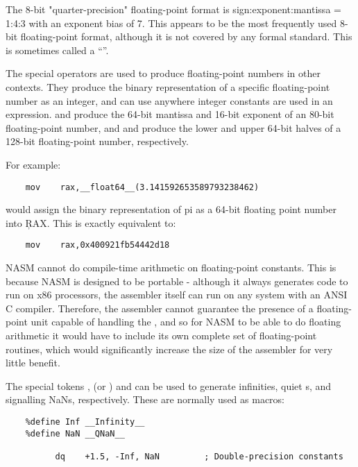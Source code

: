 The 8-bit "quarter-precision" floating-point format is
sign:exponent:mantissa = 1:4:3 with an exponent bias of 7. This
appears to be the most frequently used 8-bit floating-point format,
although it is not covered by any formal standard. This is sometimes
called a ``''.

The special operators are used to produce floating-point numbers in
other contexts. They produce the binary representation of a specific
floating-point number as an integer, and can use anywhere integer
constants are used in an expression.  and
 produce the 64-bit mantissa and 16-bit
exponent of an 80-bit floating-point number, and 
and  produce the lower and upper 64-bit halves
of a 128-bit floating-point number, respectively.

For example:

\begin{lstlisting}
	mov    rax,__float64__(3.141592653589793238462)
\end{lstlisting}

would assign the binary representation of pi as a 64-bit floating
point number into \c{RAX}. This is exactly equivalent to:

\begin{lstlisting}
	mov    rax,0x400921fb54442d18
\end{lstlisting}

NASM cannot do compile-time arithmetic on floating-point constants.
This is because NASM is designed to be portable - although it always
generates code to run on x86 processors, the assembler itself can
run on any system with an ANSI C compiler. Therefore, the assembler
cannot guarantee the presence of a floating-point unit capable of
handling the , and so for NASM
to be able to do floating arithmetic it would have to include its
own complete set of floating-point routines, which would significantly
increase the size of the assembler for very little benefit.

The special tokens ,  (or
) and  can be used to generate
infinities, quiet s, and signalling NaNs,
respectively. These are normally used as macros:

\begin{lstlisting}
	%define Inf __Infinity__
	%define NaN __QNaN__

	      dq    +1.5, -Inf, NaN         ; Double-precision constants
\end{lstlisting}

